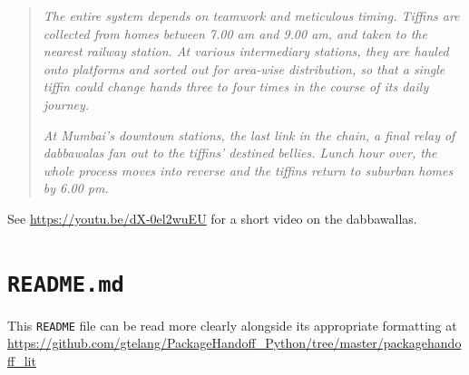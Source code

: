 \documentclass[10pt, english, oneside]{report}
\begin{document}
\begin{appendices}
\begin{quote}
\textit{The entire system depends on teamwork and meticulous timing. Tiffins are collected from homes 
between 7.00 am and 9.00 am, and taken to the nearest railway station. At various intermediary stations, 
they are hauled onto platforms and sorted out for area-wise distribution, so that a single tiffin could 
change hands three to four times in the course of its daily journey.}

\textit{At Mumbai's downtown stations, the last link in the chain, a final relay of dabbawalas fan 
out to the tiffins' destined bellies. Lunch hour over, the whole process moves into reverse and the 
tiffins return to suburban homes by 6.00 pm.}
\end{quote}

See \url{https://youtu.be/dX-0el2wuEU} for a short video on the dabbawallas. 


\chapter{\texttt{README.md}}

This \verb|README| file can be read more clearly alongside its appropriate formatting at \\
\url{https://github.com/gtelang/PackageHandoff_Python/tree/master/packagehandoff_lit}


\end{appendices}
\end{document}
